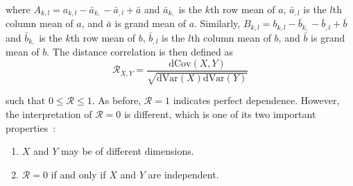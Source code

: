 \noindent where $A_{k,l}=a_{k,l}-\bar{a}_{k,}-\bar{a}_{,l}+\bar{a}$ and 
$\bar{a}_{k,}$ is the $k$th row mean of $a$, $\bar{a}_{,l}$ is the $l$th column 
mean of $a$, and $\bar{a}$ is grand mean of $a$. 
Similarly, $B_{k,l}=b_{k,l}-\bar{b}_{k,}-\bar{b}_{,l}+\bar{b}$ and 
$\bar{b}_{k,}$ is the $k$th row mean of $b$, $\bar{b}_{,l}$ is the $l$th column 
mean of $b$, and $\bar{b}$ is grand mean of $b$. The distance correlation is 
then defined as
$$\mathcal{R}_{X,Y}=\frac{\mathrm{dCov}(X,Y)}
{\sqrt{\mathrm{dVar}(X)\mathrm{dVar}(Y)}}$$

\noindent such that $0 \leq \mathcal{R} \leq 1$. As before, $\mathcal{R}=1$ 
indicates perfect dependence. However, the interpretation of $\mathcal{R}=0$ is 
different, which is one of its two important properties~\cite{szekely2007}: 

\tablespacing
\begin{enumerate}
	\item $X$ and $Y$ may be of different dimensions.
	\item $\mathcal{R}=0$ if and only if $X$ and $Y$ are independent.
\end{enumerate}
\bodyspacing

